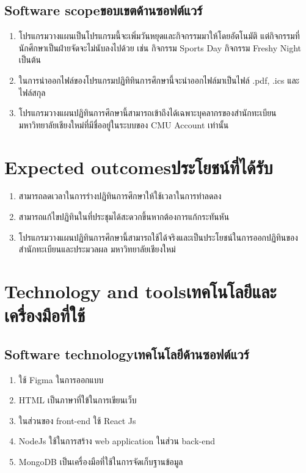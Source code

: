 \subsection{\ifenglish Software scope\else ขอบเขตด้านซอฟต์แวร์\fi}
\begin{enumerate}
\item โปรแกรมวางแผนเป็นโปรแกรมนี้จะเพิ่มวันหยุดและกิจกรรมมาให้โดยอัตโนมัติ แต่กิจกรรมที่นักศึกษาเป็นฝ่ายจัดจะไม่นับลงไปด้วย เช่น กิจกรรม Sports Day กิจกรรม Freshy Night เป็นต้น
\item ในการนำออกไฟล์ของโปรแกรมปฏิทิทินการศึกษานี้จะนำออกไฟล์มาเป็นไฟล์ .pdf, .ics และ ไฟล์สกุล 
\item โปรแกรมวางแผนปฏิทินการศึกษานี้สามารถเข้าถึงได้เฉพาะบุคลากรของสำนักทะเบียนมหาวิทยาลัยเชียงใหม่ที่มีชื่ออยู่ในระบบของ CMU Account เท่านั้น   
\end{enumerate}

\section{\ifenglish Expected outcomes\else ประโยชน์ที่ได้รับ\fi}
\begin{enumerate}
\item สามารถลดเวลาในการร่างปฏิทินการศึกษาให้ใช้เวลาในการทำลดลง
\item สามารถแก้ไขปฏิทินในที่ประชุมได้สะดวกขึ้นหากต้องการแก้กระทันหัน
\item โปรแกรมวางแผนปฏิทินการศึกษานี้สามารถใช้ได้จริงและเป็นประโยชน์ในการออกปฏิทินของสำนักทะเบียนและประมวลผล มหาวิทยาลัยเชียงใหม่
\end{enumerate}

\section{\ifenglish Technology and tools\else เทคโนโลยีและเครื่องมือที่ใช้\fi}


\subsection{\ifenglish Software technology\else เทคโนโลยีด้านซอฟต์แวร์\fi}
\begin{enumerate}
\item ใช้ Figma ในการออกแบบ
\item HTML เป็นภาษาที่ใข้ในการเขียนเว็บ 
\item ในส่วนของ front-end ใช้ React Js 
\item NodeJs ใช้ในการสร้าง web application ในส่วน back-end 
\item MongoDB เป็นเครื่องมือที่ใช้ในการจัดเก็บฐานข้อมูล
\end{enumerate}

